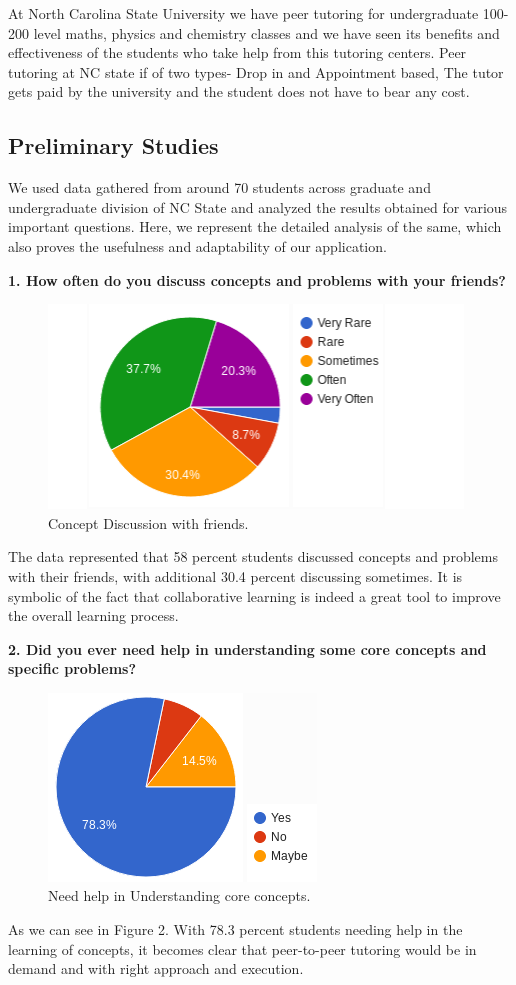 \documentclass{sig-alternate-05-2015}
\begin{document}
At North Carolina State University we have peer tutoring for undergraduate 100-200 level maths, physics and chemistry classes and we have seen its benefits and effectiveness of the students who take help from this tutoring centers. Peer tutoring at NC state if of two types- Drop in and Appointment based, The tutor gets paid by the university and the student does not have to bear any cost. 

\subsection{Preliminary Studies}
We used data gathered from around 70 students across graduate and undergraduate division of NC State and analyzed the results obtained for various important questions. Here, we represent the detailed analysis of the same, which also proves the usefulness and adaptability of our application.

\textbf {1. How often do you discuss concepts and problems with your friends?}

\begin{figure}[h!t]
\centering
\includegraphics{Q1SE}
\caption{Concept Discussion with friends.}
\end{figure}

The data represented that 58 percent students discussed concepts and problems with their friends, with additional 30.4 percent discussing sometimes. It is symbolic of the fact that collaborative learning is indeed a great tool to improve the overall learning process. 

\textbf {2. Did you ever need help in understanding some core concepts and specific problems?}

\begin{figure}[h!t]
\centering
\includegraphics{Q2SE}
\caption{Need help in Understanding core concepts.}
\label{Q2SE}
\end{figure}
As we can see in Figure 2. With 78.3 percent students needing help in the learning of concepts, it becomes clear that peer-to-peer tutoring would be in demand and with right approach and execution.
 
\end{document}
